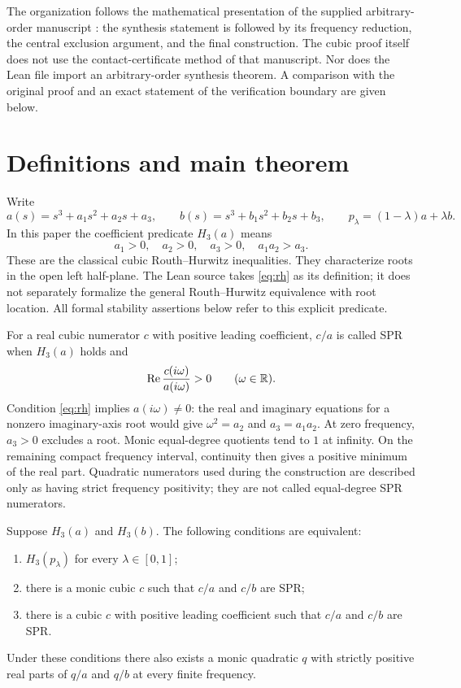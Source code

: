\documentclass[11pt]{article}
\begin{document}
The organization follows the mathematical presentation of the supplied arbitrary-order manuscript \cite{referenceDraft}: the synthesis statement is followed by its frequency reduction, the central exclusion argument, and the final construction. The cubic proof itself does not use the contact-certificate method of that manuscript. Nor does the Lean file import an arbitrary-order synthesis theorem. A comparison with the original proof and an exact statement of the verification boundary are given below.

\section{Definitions and main theorem}
Write
\[
 a(s)=s^3+a_1s^2+a_2s+a_3,\qquad
 b(s)=s^3+b_1s^2+b_2s+b_3,
 \qquad p_\lambda=(1-\lambda)a+\lambda b.
\]
In this paper the coefficient predicate $H_3(a)$ means
\begin{equation}\label{eq:rh}
 a_1>0,\quad a_2>0,\quad a_3>0,\quad a_1a_2>a_3.
\end{equation}
These are the classical cubic Routh--Hurwitz inequalities. They characterize roots in the open left half-plane. The Lean source takes \eqref{eq:rh} as its definition; it does not separately formalize the general Routh--Hurwitz equivalence with root location. All formal stability assertions below refer to this explicit predicate.

For a real cubic numerator $c$ with positive leading coefficient, $c/a$ is called SPR when $H_3(a)$ holds and
\begin{equation}\label{eq:spr}
 \operatorname{Re}\frac{c(i\omega)}{a(i\omega)}>0\qquad(\omega\in\mathbb R).
\end{equation}
Condition \eqref{eq:rh} implies $a(i\omega)\ne0$: the real and imaginary equations for a nonzero imaginary-axis root would give $\omega^2=a_2$ and $a_3=a_1a_2$. At zero frequency, $a_3>0$ excludes a root. Monic equal-degree quotients tend to $1$ at infinity. On the remaining compact frequency interval, continuity then gives a positive minimum of the real part. Quadratic numerators used during the construction are described only as having strict frequency positivity; they are not called equal-degree SPR numerators.

\begin{theorem}\label{thm:main}
Suppose $H_3(a)$ and $H_3(b)$. The following conditions are equivalent:
\begin{enumerate}
\item $H_3(p_\lambda)$ for every $\lambda\in[0,1]$;
\item there is a monic cubic $c$ such that $c/a$ and $c/b$ are SPR;
\item there is a cubic $c$ with positive leading coefficient such that $c/a$ and $c/b$ are SPR.
\end{enumerate}
Under these conditions there also exists a monic quadratic $q$ with strictly positive real parts of $q/a$ and $q/b$ at every finite frequency.
\end{theorem}
\end{document}
